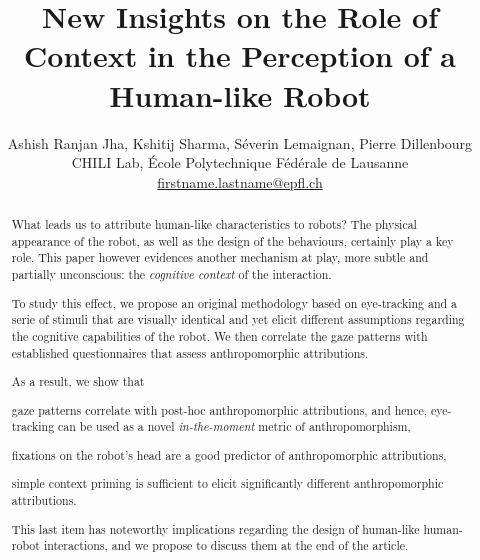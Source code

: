 \documentclass[a4,twocolumn,10pt]{article}
\title{New Insights on the Role of Context in the Perception of a Human-like Robot}
\author{
Ashish Ranjan Jha, Kshitij Sharma, Séverin Lemaignan, Pierre Dillenbourg\\
CHILI Lab, École Polytechnique Fédérale de Lausanne\\
\url{firstname.lastname@epfl.ch}
}
\begin{document}
\maketitle
\begin{abstract}

What leads us to attribute human-like characteristics to robots? The physical
appearance of the robot, as well as the design of the behaviours, certainly play a key
role. This paper however evidences another mechanism at play, more subtle and partially
unconscious: the \emph{cognitive context}
of the interaction.

To study this effect, we propose an original methodology based on eye-tracking
and a serie of stimuli that are visually identical and yet elicit different
assumptions regarding the cognitive capabilities of the robot. We then correlate
the gaze patterns with established questionnaires that assess anthropomorphic
attributions.

\begin{inparaenum}
As a result, we show that \item gaze patterns correlate with post-hoc anthropomorphic
attributions, and hence, eye-tracking can be used as a novel \emph{in-the-moment}
metric of anthropomorphism, \item fixations on the robot's head are a good
predictor of anthropomorphic attributions, \item simple context priming is sufficient
to elicit significantly different anthropomorphic attributions.
\end{inparaenum}

This last item has noteworthy implications regarding the design of human-like human-robot
interactions, and we propose to discuss them at the end of the article.


\end{abstract}
\end{document}

